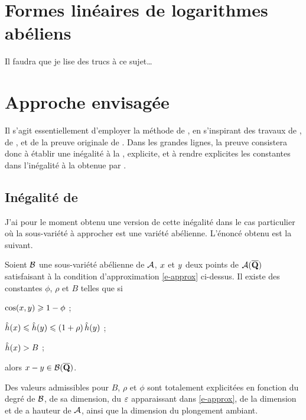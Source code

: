 \printbibliography[heading=bibempty]

\else

\section{Formes linéaires de logarithmes abéliens}

Il faudra que je lise des trucs à ce sujet\dots

\section{Approche envisagée}\label{s-approche}

Il s'agit essentiellement d'employer la méthode de , en s'inspirant
des travaux de  \cite{remivds,remivg,remdcl}, de 
\cite{farhith}, et de la preuve originale de  \cite{falda}. Dans
les grandes lignes, la preuve consistera donc à établir une inégalité à la
, explicite, et à rendre explicites les constantes dans
l'inégalité à la  obtenue par .

\subsection{Inégalité de }

J'ai pour le moment obtenu une version de cette inégalité dans le cas
particulier où la sous-variété à approcher est une variété abélienne.
L'énoncé obtenu est la suivant.

\begin{thm} \label{thm-mumford}
  Soient $\mathcal B$ une sous-variété abélienne de $\mathcal A$, $x$ et $y$
  deux points de $\mathcal A(\overline{\mathbf{Q}})$ satisfaisant à la condition d'approximation
  \eqref{e-approx} ci-dessus. Il existe des constantes $\phi$, $\rho$ et $B$
  telles que si
  \begin{enumthm}
    \item $\cos(x, y) \geqslant 1 - \phi$ ;
    \item $\mathop{\smash{\hat h}}(x) \leqslant \mathop{\smash{\hat h}}(y) \leqslant (1+\rho) \mathop{\smash{\hat h}}(y)$ ;
    \item $\mathop{\smash{\hat h}}(x) > B$ ;
  \end{enumthm}
  alors $x - y \in \mathcal B(\overline{\mathbf{Q}})$.
\end{thm}

Des valeurs admissibles pour $B$, $\rho$ et $\phi$ sont totalement explicitées
en fonction du degré de $\mathcal B$, de sa dimension, du $\varepsilon$ apparaissant dans
\eqref{e-approx}, de la dimension et de a hauteur de $\mathcal A$, ainsi que la dimension
du plongement ambiant.


